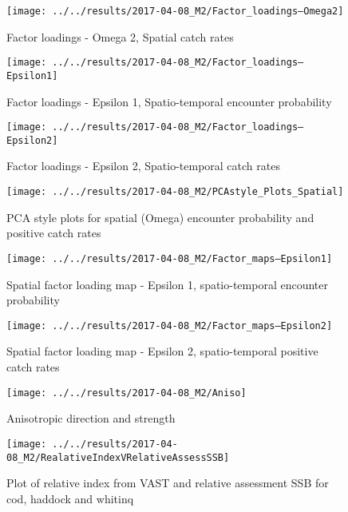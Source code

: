 \documentclass[11pt]{article}
\begin{document}
\begin{figure}[!ht]
	\texttt{[image: ../../results/2017-04-08\_M2/Factor\_loadings--Omega2]}
	\label{fig:Fact2}
	\caption{Factor loadings - Omega 2, Spatial catch rates}
\end{figure}

\begin{figure}[!ht]
	\texttt{[image: ../../results/2017-04-08\_M2/Factor\_loadings--Epsilon1]}
	\label{fig:Fact3}
	\caption{Factor loadings - Epsilon 1, Spatio-temporal encounter probability}
\end{figure}

\begin{figure}[!ht]
	\texttt{[image: ../../results/2017-04-08\_M2/Factor\_loadings--Epsilon2]}
	\label{fig:Fact4}
	\caption{Factor loadings - Epsilon 2, Spatio-temporal catch rates}
\end{figure}

\begin{figure}[!ht]
	\texttt{[image: ../../results/2017-04-08\_M2/PCAstyle\_Plots\_Spatial]}
	\label{fig:PCA1}
	\caption{PCA style plots for spatial (Omega) encounter probability and positive catch rates}
\end{figure}

\begin{figure}[!ht]
	\texttt{[image: ../../results/2017-04-08\_M2/Factor\_maps--Epsilon1]}
	\label{fig:FactMap3}
	\caption{Spatial factor loading map - Epsilon 1, spatio-temporal encounter probability}
\end{figure}

\begin{figure}[!ht]
	\texttt{[image: ../../results/2017-04-08\_M2/Factor\_maps--Epsilon2]}
	\label{fig:FactMap4}
	\caption{Spatial factor loading map - Epsilon 2, spatio-temporal positive catch rates}
\end{figure}

\begin{figure}[!ht]
	\center
	\texttt{[image: ../../results/2017-04-08\_M2/Aniso]}
	\label{fig:Aniso}
	\caption{Anisotropic direction and strength}
\end{figure}

\begin{figure}[!ht]
	\center
	\texttt{[image: ../../results/2017-04-08\_M2/RealativeIndexVRelativeAssessSSB]}
	\label{fig:IndexRel}
	\caption{Plot of relative index from VAST and relative assessment SSB
		for cod, haddock and whitinq}
\end{figure}

\end{document}
